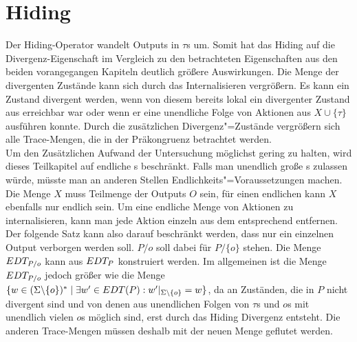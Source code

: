 \section{Hiding}

Der Hiding-Operator wandelt Outputs in $\tau$s um. Somit hat das Hiding auf die
Divergenz-Eigenschaft im Vergleich zu den betrachteten Eigenschaften aus den
beiden vorangegangen Kapiteln deutlich größere Auswirkungen. Die Menge der
divergenten Zustände kann sich durch das Internalisieren vergrößern. Es kann
ein Zustand divergent werden, wenn von diesem bereits lokal ein divergenter
Zustand aus erreichbar war oder wenn er eine unendliche Folge von Aktionen aus
$X\cup \{\tau\}$ ausführen konnte. Durch die zusätzlichen Divergenz"=Zustände
vergrößern sich alle Trace-Mengen, die in der Präkongruenz \DRel{} betrachtet
werden.\\
Um den Zusätzlichen Aufwand der Untersuchung möglichst gering zu halten, wird
dieses Teilkapitel auf endliche \MEIO{}s beschränkt. Falls man unendlich große
\MEIO{}s zulassen würde, müsste man an anderen Stellen
Endlichkeits"=Voraussetzungen machen.\\
Die Menge $X$ muss Teilmenge der Outputs $O$ sein, für einen endlichen \MEIO{}
kann $X$ ebenfalls nur endlich sein. Um eine endliche Menge von Aktionen zu
internalisieren, kann man jede Aktion einzeln aus dem entsprechend \MEIO{}
entfernen. Der folgende Satz kann also darauf beschränkt werden, dass nur ein
einzelnen Output verborgen werden soll. $P/o$ soll dabei für $P/\{o\}$ stehen.
Die Menge $EDT _{P/o}$ kann aus $EDT _P$ konstruiert werden. Im allgemeinen
ist die Menge $EDT _{P/o}$ jedoch größer wie die Menge $\{w\in
(\Sigma\backslash \{o\})^*\mid \exists w'\in EDT(P): w'|_{\Sigma\backslash
\{o\}} = w\}$, da an Zuständen, die in $P$ nicht divergent sind und von denen
aus unendlichen Folgen von $\tau$s und $o$s mit unendlich vielen $o$s möglich
sind, erst durch das Hiding Divergenz entsteht. Die anderen Trace-Mengen müssen
deshalb mit der neuen \EDT{} Menge geflutet werden.


